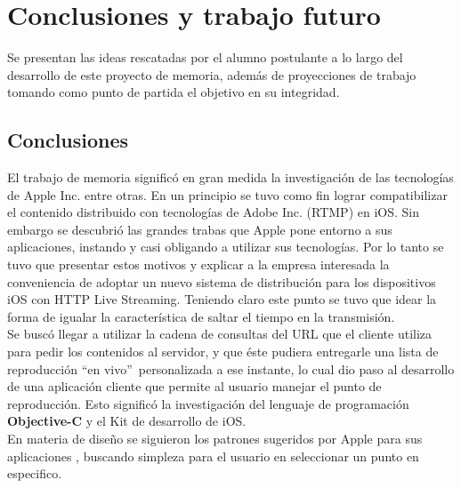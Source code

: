 
\chapter{Conclusiones y trabajo futuro}
Se presentan las ideas rescatadas por el alumno postulante a lo largo del desarrollo de este proyecto de memoria, además de proyecciones de trabajo tomando como punto de partida el objetivo en su integridad.


\section{Conclusiones}

El trabajo de memoria significó en gran medida la investigación de las tecnologías de Apple Inc. entre otras. En un principio se tuvo como fin lograr compatibilizar el contenido distribuido con tecnologías de Adobe Inc. (RTMP) en iOS. 
Sin embargo se descubrió las grandes trabas que Apple pone entorno a sus aplicaciones, instando y casi obligando a utilizar sus tecnologías. 
Por lo tanto se tuvo que presentar estos motivos y explicar a la empresa interesada la conveniencia de adoptar un nuevo sistema de distribución para los dispositivos iOS con HTTP Live Streaming. Teniendo claro este punto se tuvo que idear la forma de igualar la característica de saltar el tiempo en la transmisión. \\ 

Se buscó llegar a utilizar la cadena de consultas del URL que el cliente utiliza para pedir los contenidos al servidor, y que éste pudiera entregarle una lista de reproducción \textquotedblleft en vivo\textquotedblright \ personalizada a ese instante, lo cual dio paso al desarrollo de una aplicación cliente que permite al usuario manejar el punto de reproducción. Esto significó la investigación del lenguaje de programación \textbf{Objective-C} y el Kit de desarrollo de iOS.\\

En materia de diseño se siguieron los patrones sugeridos por Apple para sus aplicaciones \cite{apple-interface-user-control}, buscando simpleza para el usuario en seleccionar un punto en especifico.\\

